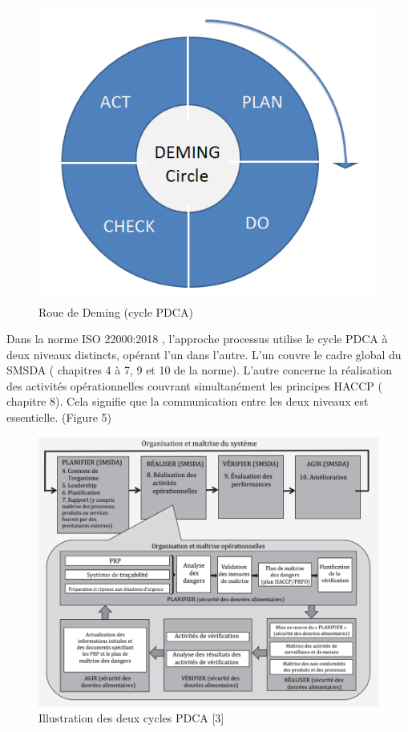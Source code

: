 \begin{spacing}{1.2}
\begin{figure}[!ht]\centering
\includegraphics[scale=0.3]{image2.png}
\caption{Roue de Deming (cycle PDCA)}
\label{fig:fig1}
\end{figure}


Dans la norme ISO 22000:2018 , l’approche processus utilise le cycle PDCA à deux niveaux distincts, opérant l’un dans l’autre. L’un couvre le cadre global du SMSDA ( chapitres 4 à 7, 9 et 10 de la norme). L’autre concerne la réalisation des activités opérationnelles couvrant simultanément les principes HACCP ( chapitre 8). Cela signifie que la communication entre les deux niveaux est essentielle. (Figure 5)


\begin{figure}[!ht]\centering
\includegraphics[scale=5]{image1.png}
\caption{ Illustration des deux cycles PDCA [3]}
\label{fig:fig1}
\end{figure}


\end{spacing}
